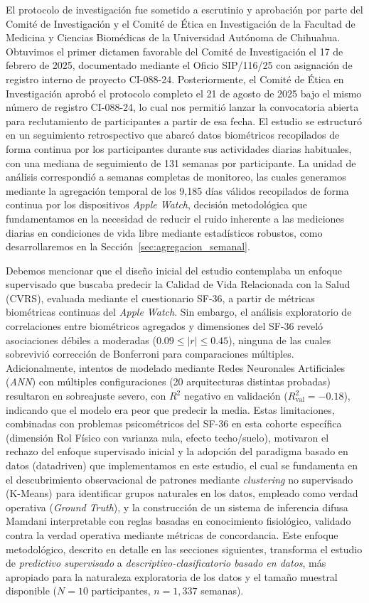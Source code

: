 El protocolo de investigación fue sometido a escrutinio y aprobación por parte del Comité de Investigación y el Comité de Ética en Investigación de la Facultad de Medicina y Ciencias Biomédicas de la Universidad Autónoma de Chihuahua. Obtuvimos el primer dictamen favorable del Comité de Investigación el 17 de febrero de 2025, documentado mediante el Oficio SIP/116/25 con asignación de registro interno de proyecto CI-088-24. Posteriormente, el Comité de Ética en Investigación aprobó el protocolo completo el 21 de agosto de 2025 bajo el mismo número de registro CI-088-24, lo cual nos permitió lanzar la convocatoria abierta para reclutamiento de participantes a partir de esa fecha. El estudio se estructuró en un seguimiento retrospectivo que abarcó datos biométricos recopilados de forma continua por los participantes durante sus actividades diarias habituales, con una mediana de seguimiento de 131 semanas por participante. La unidad de análisis correspondió a semanas completas de monitoreo, las cuales generamos mediante la agregación temporal de los 9,185 días válidos recopilados de forma continua por los dispositivos \textit{Apple Watch}, decisión metodológica que fundamentamos en la necesidad de reducir el ruido inherente a las mediciones diarias en condiciones de vida libre mediante estadísticos robustos, como desarrollaremos en la Sección~\ref{sec:agregacion_semanal}.

Debemos mencionar que el diseño inicial del estudio contemplaba un enfoque supervisado que buscaba predecir la Calidad de Vida Relacionada con la Salud (CVRS), evaluada mediante el cuestionario SF-36, a partir de métricas biométricas continuas del \textit{Apple Watch}. Sin embargo, el análisis exploratorio de correlaciones entre biométricos agregados y dimensiones del SF-36 reveló asociaciones débiles a moderadas ($0.09 \leq |r| \leq 0.45$), ninguna de las cuales sobrevivió corrección de Bonferroni para comparaciones múltiples. Adicionalmente, intentos de modelado mediante Redes Neuronales Artificiales (\textit{ANN}) con múltiples configuraciones (20 arquitecturas distintas probadas) resultaron en sobreajuste severo, con $R^2$ negativo en validación ($R^2_{\text{val}} = -0.18$), indicando que el modelo era peor que predecir la media. Estas limitaciones, combinadas con problemas psicométricos del SF-36 en esta cohorte específica (dimensión Rol Físico con varianza nula, efecto techo/suelo), motivaron el rechazo del enfoque supervisado inicial y la adopción del paradigma basado en datos (datadriven) que implementamos en este estudio, el cual se fundamenta en el descubrimiento observacional de patrones mediante \textit{clustering} no supervisado (K-Means) para identificar grupos naturales en los datos, empleado como verdad operativa (\textit{Ground Truth}), y la construcción de un sistema de inferencia difusa Mamdani interpretable con reglas basadas en conocimiento fisiológico, validado contra la verdad operativa mediante métricas de concordancia. Este enfoque metodológico, descrito en detalle en las secciones siguientes, transforma el estudio de \textit{predictivo supervisado} a \textit{descriptivo-clasificatorio basado en datos}, más apropiado para la naturaleza exploratoria de los datos y el tamaño muestral disponible ($N=10$ participantes, $n=1,337$ semanas).

